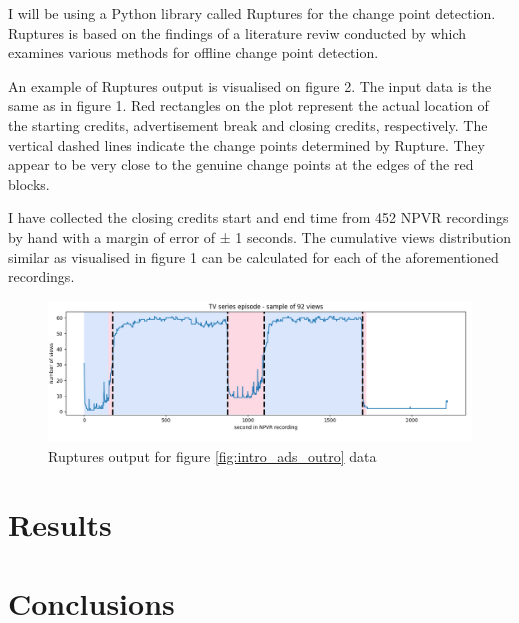 I will be using a Python library called Ruptures for the change point detection. Ruptures is based on the findings of a literature reviw conducted by \cite{truongSelectiveReviewOffline2020} which examines various methods for offline change point detection.

An example of Ruptures output is visualised on figure 2. The input data is the same as in figure 1. Red rectangles on the plot represent the actual location of the starting credits, advertisement break and closing credits, respectively. The vertical dashed lines indicate the change points determined by Rupture. They appear to be very close to the genuine change points at the edges of the red blocks.

I have collected the closing credits start and end time from 452 NPVR recordings by hand with a margin of error of ± 1 seconds. The cumulative views distribution similar as visualised in figure 1 can be calculated for each of the aforementioned recordings.

\begin{figure}[H]
\centering
\includegraphics[width=1\textwidth]{../plots/episode-pen100.png}
\caption{Ruptures output for figure \ref{fig:intro_ads_outro} data}
\label{fig:ruptures_change_detection}
\end{figure}

\section{Results} \label{sec:results}

\section{Conclusions} \label{sec:conclusions}
